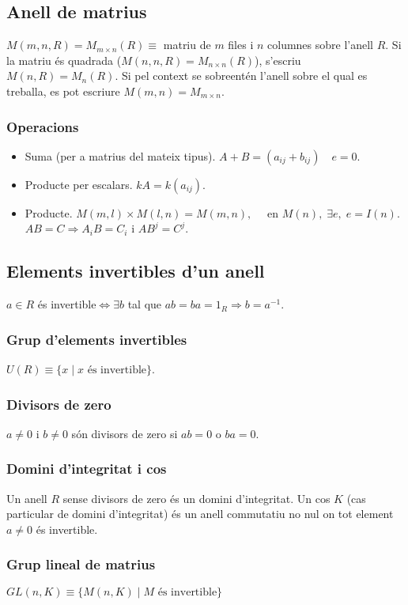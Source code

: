 \subsection{Anell de matrius}
$M(m,n,R) = M_{m \times n} (R) \equiv$ matriu de $m$ files i $n$ columnes sobre l'anell $R$. Si la matriu és quadrada ($M(n,n,R) = M_{n \times n} (R)$), s'escriu $M(n,R) = M_{n} (R)$. Si pel context se sobreentén l'anell sobre el qual es treballa, es pot escriure $M(m,n) = M_{m \times n}$.

\subsubsection*{Operacions}
\begin{itemize}
    \item Suma (per a matrius del mateix tipus).
        \subitem $A+B = (a_{ij} + b_{ij}) \quad e=0$.
    \item Producte per escalars.
        \subitem $kA = k(a_{ij})$.
    \item Producte.
        \subitem $M(m,l) \times M(l,n) = M(m,n), \quad$ en $M(n), \; \exists e, \; e = I(n)$.
        \subitem $AB=C \Rightarrow A_{i} B = C_{i} \text{ i } AB^{j} = C^{j}$.
\end{itemize}

\subsection{Elements invertibles d'un anell}
$a \in R$ és invertible$\Leftrightarrow \exists b$ tal que $ab = ba = 1_{R} \Rightarrow b = a^{-1}$.

\subsubsection*{Grup d'elements invertibles}
$U(R) \equiv \{ x \mid x \textrm{ és invertible} \}$.

\subsubsection*{Divisors de zero}
$a \neq 0$ i $b \neq 0$ són divisors de zero si $ab=0$ o $ba=0$.

\subsubsection*{Domini d'integritat i cos}
Un anell $R$ sense divisors de zero és un domini d'integritat. Un cos $K$ (cas particular de domini d'integritat) és un anell commutatiu no nul on tot element $a \neq 0$ és invertible.

\subsubsection*{Grup lineal de matrius}
$GL(n,K) \equiv \{ M(n,K) \mid M \textrm{ és invertible} \}$